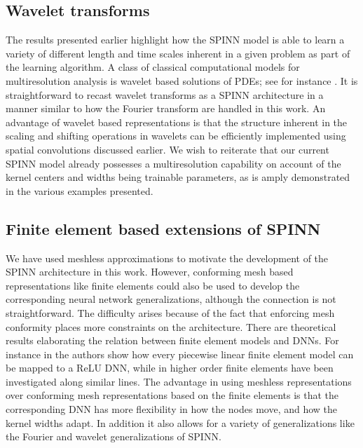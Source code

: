 \documentclass[12pt]{article}
\begin{document}
\subsection{Wavelet transforms}
The results presented earlier highlight how the SPINN model is able to learn a variety of different length and time scales inherent in a given problem as part of the learning algorithm. A class of classical computational models for multiresolution analysis is wavelet based solutions of PDEs; see for instance \cite{WA94}. It is straightforward to recast wavelet transforms as a SPINN architecture in a manner similar to how the Fourier transform are handled in this work. An advantage of wavelet based representations is that the structure inherent in the scaling and shifting operations in wavelets can be efficiently implemented using spatial convolutions discussed earlier. We wish to reiterate that our current SPINN model already possesses a multiresolution capability on account of the kernel centers and widths being trainable parameters, as is amply demonstrated in the various examples presented.

\subsection{Finite element based extensions of SPINN}
We have used meshless approximations to motivate the development of the SPINN architecture in this work. However, conforming mesh based representations like finite elements could also be used to develop the corresponding neural network generalizations, although the connection is not straightforward. The difficulty arises because of the fact that enforcing mesh conformity places more constraints on the architecture. There are theoretical results elaborating the relation between finite element models and DNNs. For instance in \cite{HLXZ2020} the authors show how every piecewise linear finite element model can be mapped to a ReLU DNN, while in \cite{OPS19} higher order finite elements have been investigated along similar lines.  The advantage in using meshless representations over conforming mesh representations based on the finite elements is that the corresponding DNN has more flexibility in how the nodes move, and how the kernel widths adapt. In addition it also allows for a variety of generalizations like the Fourier and wavelet generalizations of SPINN.
\end{document}
